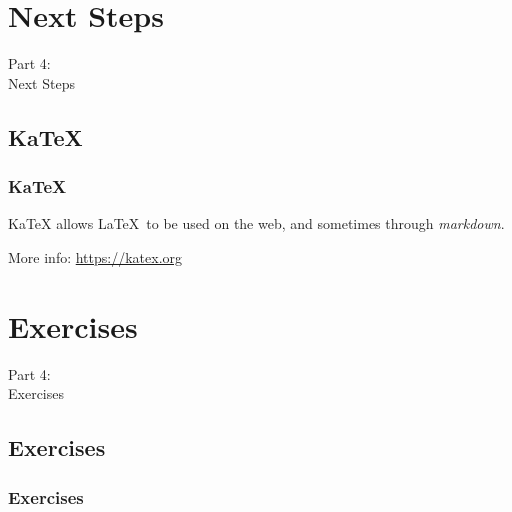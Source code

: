 
{
\renewcommand{\bgcolor}{next}

\section{Next Steps}
\begin{frame}
  \vspace{25mm}
  \begin{center}
    \Huge{Part 4:\\Next Steps}
  \end{center}
\end{frame}

\subsection{KaTeX}
\begin{frame}[fragile]
  \frametitle{KaTeX}
  \vspace{3mm}
  KaTeX allows \LaTeX\ to be used on the web, and sometimes through \textsl{markdown}.
  
  \vspace{5mm}
  More info: \url{https://katex.org}
\end{frame}

}


{
\renewcommand{\bgcolor}{exercises}

\section{Exercises}
\begin{frame}
  \vspace{25mm}
  \begin{center}
    \Huge{Part 4:\\Exercises}
  \end{center}
\end{frame}

\subsection{Exercises}
\begin{frame}[fragile]
  \frametitle{Exercises}
  \vspace{3mm}
  \begin{enumerate}
  \end{enumerate}
\end{frame}

}

